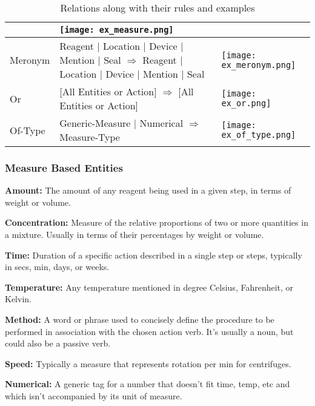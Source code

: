 \documentclass[11pt,a4paper]{article}
\begin{document}
\begin{table*}[]
\begin{tabular}{|m{1.8cm}|m{7.9cm}|m{5cm}|}
    & \vspace{0.12cm}\texttt{[image: ex\_measure.png]} \\
    \hline
    Meronym & Reagent $\vert$ Location $\vert$ Device $\vert$ Mention $\vert$ Seal $\Rightarrow$ Reagent $\vert$ Location $\vert$ Device $\vert$ Mention $\vert$ Seal
    & \vspace{0.12cm}\texttt{[image: ex\_meronym.png]} \\
    \hline
    Or & [All Entities or Action] $\Rightarrow$ [All Entities or Action]
    & \vspace{0.12cm}\texttt{[image: ex\_or.png]} \\
    \hline
    Of-Type & Generic-Measure $\vert$ Numerical $\Rightarrow$ Measure-Type
    & \vspace{0.12cm}\texttt{[image: ex\_of\_type.png]} \\
    \hline
    
\end{tabular}
\caption{Relations along with their rules and examples}
\end{table*}

\subsubsection{Measure Based Entities}

\noindent
\textbf{Amount:} The amount of any reagent being used in a given step, in terms of weight or volume. 

\noindent
\textbf{Concentration:} Measure of the relative proportions of two or more quantities in a mixture. Usually in terms of their percentages by weight or volume.

\noindent
\textbf{Time:} Duration of a specific action described in a single step or steps, typically in secs, min, days, or weeks.

\noindent
\textbf{Temperature:} Any temperature mentioned in degree Celsius, Fahrenheit, or Kelvin. 

\noindent
\textbf{Method:} A word or phrase used to concisely define the procedure to be performed in association with the chosen action verb. It’s usually a noun, but could also be a passive verb. 

\noindent
\textbf{Speed:} Typically a measure that represents rotation per min for centrifuges. 

\noindent
\textbf{Numerical:} A generic tag for a number that doesn't fit time, temp, etc and which isn't accompanied by its unit of measure.
\end{document}
